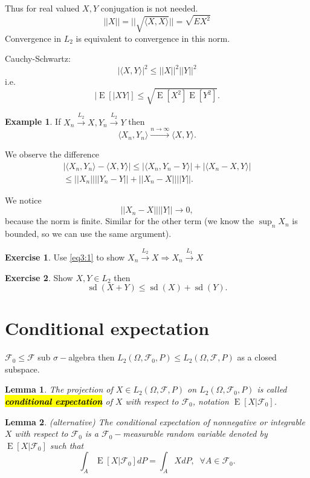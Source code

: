 \documentclass[12pt,a4paper, notitlepage]{book}
\newcommand{\hlc}[2][yellow]{ {\sethlcolor{#1} \hl{#2}} }
\newcommand{\hlcr}[1]{\hlc[lightred]{#1}}
\theoremstyle{definition} %
\newtheorem{example}{Example}[chapter]
\newtheorem{exercise}{Exercise}[chapter]
\theoremstyle{plain} %
\newtheorem{definition}{Lemma}[chapter]
\newcommand{\Fc}{\mathcal{ F}}
\DeclareMathOperator{\E}{E}
\DeclareMathOperator{\Sd}{sd}
\newcommand{\New}[1]{ {\bf \hlcr{#1} } }
\begin{document}
Thus for real valued $X,Y$ conjugation is not needed. 
\[ ||  X || = ||\sqrt{\langle X,X \rangle}|| = \sqrt{EX^2} \]
Convergence in $L_2$ is equivalent to convergence in this norm.

Cauchy-Schwartz:
\[ |\langle X,Y\rangle |^2 \leq ||X||^2 ||Y||^2 \label{eq3:1} \]
i.e.
\[ |\E[ | X Y| ] \leq \sqrt{\E[X^2]  \E[Y^2]}. \]

\begin{example}
If $X_n \overset{L_2}{\rightarrow} X, Y_n \overset{L_2}{\rightarrow} Y$ then
\[  \langle X_n, Y_n\rangle \overset{n \to \infty}{ \rightarrow} \langle X,Y \rangle  . \]
\end{example}
\proof
We observe the difference 
\begin{align*} |\langle X_n, Y_n\rangle  - \langle X,Y\rangle | \leq |\langle X_n, Y_n - Y \rangle | + |\langle X_n - X, Y \rangle | \\ 
\leq ||X_n|| ||Y_n - Y|| + ||X_n - X|| ||Y||.
\end{align*} 

We notice 
\[ ||X_n - X||||Y||\rightarrow 0, \]  because the norm is finite. Similar for the other term (we know the $ \sup_n X_n$ is bounded, so we can use the same argument). 
\endproof


\begin{exercise}
Use 
\ref{eq3:1}
 to show $X_n \overset{L_2}{\rightarrow} X \Rightarrow X_n \overset{L_1}{\rightarrow} X$
\end{exercise}


\begin{exercise}
Show $X, Y \in L_2$ then
\[ \Sd(X + Y) \leq \Sd(X) + \Sd(Y) . \]
\end{exercise}

\section{Conditional expectation}

$ \Fc_0 \leq \Fc$ sub $\sigma-$algebra then
$L_2(\Omega, \Fc_0, P) \leq L_2(\Omega, \Fc, P)$ as a closed subspace.


\begin{definition}
The projection of $X \in L_2(\Omega, \Fc, P)$ on  $L_2(\Omega, \Fc_0, P)$ is called \New{ conditional expectation} of $X$ with respect to $\Fc_0$, notation $\E[X | \Fc_0]$.
\end{definition}

\begin{definition} (alternative)
The conditional expectation of nonnegative or integrable $X$ with respect to $\Fc_0$ is a $\Fc_0-$measurable random variable denoted by $\E[X | \Fc_0]$ such that 
\[ \int_A \E[X | \Fc_0] dP = \int_A X dP, \;\; \forall A \in \Fc_0. \]
\end{definition}
\end{document}
